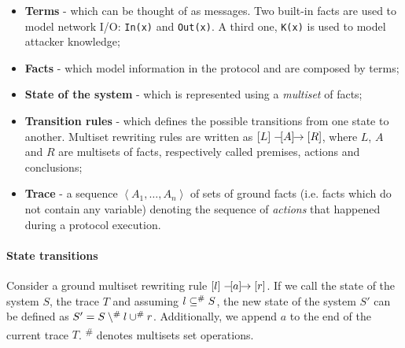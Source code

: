 \lstset{language=tamarin}
\begin{itemize}
    \item{\textbf{Terms} - which can be thought of as messages. Two built-in facts are used to model network I/O: \lstinline{In(x)} and \lstinline{Out(x)}. A third one, \lstinline{K(x)} is used to model attacker knowledge;}
    \item{\textbf{Facts} - which model information in the protocol and are composed by terms;}
    \item{\textbf{State of the system} - which is represented using a \textit{multiset} of facts;}
    \item{\textbf{Transition rules} - which defines the possible transitions from one state to another. Multiset rewriting rules are written as $\left[L\right] \mathrel{-\hspace{-2pt}[A]\hspace{-4pt}\to} \left[R\right]$, where $L$, $A$ and $R$ are multisets of facts, respectively called premises, actions and conclusions;}
    \item{\textbf{Trace} - a sequence $\left<A_1, \dots, A_n\right>$ of sets of ground facts (i.e. facts which do not contain any variable) denoting the sequence of \textit{actions} that happened during a protocol execution.}
\end{itemize}

\paragraph{State transitions}
Consider a ground multiset rewriting rule $\left[l\right] \mathrel{-\hspace{-2pt}[a]\hspace{-4pt}\to} \left[r\right]$. If we call the state of the system $S$, the trace $T$ and assuming $l \subseteq^\# S$, the new state of the system $S'$ can be defined as $S' = S \setminus^\# l \cup^\# r$. Additionally, we append $a$ to the end of the current trace $T$. \textsuperscript{\#} denotes multisets set operations.





